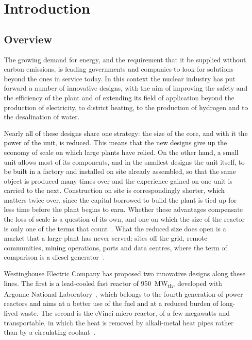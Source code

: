 
\chapter{Introduction}\label{ch:introduction}

\section{Overview}

The growing demand for energy, and the requirement that it be supplied without
carbon emissions, is leading governments and companies to look for solutions
beyond the ones in service today. In this context the nuclear industry has put
forward a number of innovative designs, with the aim of improving the safety and
the efficiency of the plant and of extending its field of application beyond the
production of electricity, to district heating, to the production of hydrogen
and to the desalination of water.

Nearly all of these designs share one strategy: the size of the core, and with
it the power of the unit, is reduced. This means that the new designs give up
the economy of scale on which large plants have relied. On the other hand, a
small unit allows most of its components, and in the smallest
designs the unit itself, to be built in a factory and installed on site already
assembled, so that the same object is produced many times over and the
experience gained on one unit is carried to the next. Construction on site is
correspondingly shorter, which matters twice over, since the capital borrowed to
build the plant is tied up for less time before the plant begins to earn.
Whether these advantages compensate the loss of scale is a question of its own,
and one on which the size of the reactor is only one of the terms that
count~\cite{smrEconomics}. What the reduced size does open is a market that a
large plant has never served: sites off the grid, remote communities, mining
operations, ports and data centres, where the term of
comparison is a diesel generator~\cite{hpmrMarkets,econByDesign}.

Westinghouse Electric Company has proposed two innovative designs along these
lines. The first is a lead-cooled fast reactor of \SI{950}{MW_{th}}, developed
with Argonne National Laboratory~\cite{wecLFR}, which belongs to the fourth
generation of power reactors and aims at a better use of the fuel and at a
reduced burden of long-lived waste. The second is the eVinci micro reactor, of a
few megawatts and transportable, in which the heat is removed by alkali-metal
heat pipes rather than by a circulating coolant~\cite{eVinci}.


